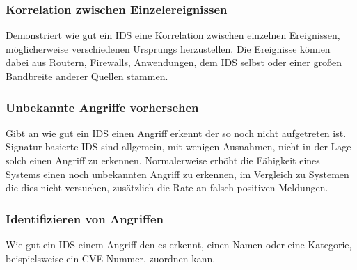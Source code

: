 \subsubsection{Korrelation zwischen Einzelereignissen }
Demonstriert wie gut ein IDS eine Korrelation zwischen einzelnen Ereignissen, möglicherweise verschiedenen Ursprungs herzustellen. Die Ereignisse können dabei aus Routern, Firewalls, Anwendungen, dem IDS selbst oder einer großen Bandbreite anderer Quellen stammen.
\subsubsection{Unbekannte Angriffe vorhersehen}
Gibt an wie gut ein IDS einen Angriff erkennt der so noch nicht aufgetreten ist. Signatur-basierte IDS sind allgemein, mit wenigen Ausnahmen, nicht in der Lage solch einen Angriff zu erkennen. Normalerweise erhöht die Fähigkeit eines Systems einen noch unbekannten Angriff zu erkennen, im Vergleich zu Systemen die dies nicht versuchen, zusätzlich die Rate an falsch-positiven Meldungen.
\subsubsection{Identifizieren von Angriffen}
Wie gut ein IDS einem Angriff den es erkennt, einen Namen oder eine Kategorie, beispielsweise ein CVE-Nummer, zuordnen kann.
